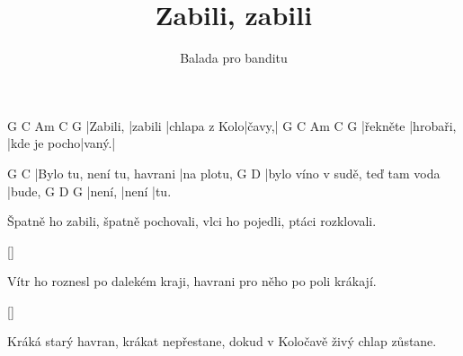 \documentclass{song}
\title{Zabili, zabili}
\author{Balada pro banditu}
\begin{document}
\strophe
G        C       Am            C     G
|Zabili, |zabili |chlapa z Kolo|čavy,|
G        C         Am           C     G
|řekněte |hrobaři, |kde je pocho|vaný.|
\endstrophe

G                          C
|Bylo tu, není tu, havrani |na plotu,
G                               D
|bylo víno v sudě, teď tam voda |bude,
G      D     G
|není, |není |tu.
\endstrophe

\strophe*
Špatně ho zabili, špatně pochovali,
vlci ho pojedli, ptáci rozklovali.
\endstrophe

\ref{}

\strophe*
Vítr ho roznesl po dalekém kraji,
havrani pro něho po poli krákají.
\endstrophe

\ref{}

\strophe*
Kráká starý havran, krákat nepřestane,
dokud v Koločavě živý chlap zůstane.
\endstrophe
\end{document}
